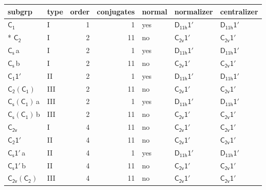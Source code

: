 \documentclass[10pt,a4paper]{article}
\numberwithin{equation}{section}
\newcommand{\grp}[1]{\mathsf{#1}}
\newcommand{\clsletter}[1]{\,{\scriptsize\color{black!55}#1}}
\begin{document}
{\small\begin{longtable}{@{}llrrlll@{}}\toprule
subgrp & type & order & conjugates & normal & normalizer & centralizer\\\midrule\endhead
\bottomrule\endfoot\endlastfoot
\href{../../../rotation/data/pdf/C1.pdf}{$\grp{C_{1}}$} & I & 1 & 1 & yes & \href{D11h-1p.pdf}{$\grp{D_{11h}1'}$} & \href{D11h-1p.pdf}{$\grp{D_{11h}1'}$}\\*
\href{../../../rotation/data/pdf/C2.pdf}{$\grp{C_{2}}$} & I & 2 & 11 & no & \href{C2v-1p.pdf}{$\grp{C_{2v}1'}$} & \href{C2v-1p.pdf}{$\grp{C_{2v}1'}$}\\
\href{../../../rotation/data/pdf/C1v.pdf}{$\grp{C_{s}}$}\clsletter{a} & I & 2 & 1 & yes & \href{D11h-1p.pdf}{$\grp{D_{11h}1'}$} & \href{D11h-1p.pdf}{$\grp{D_{11h}1'}$}\\
\href{../../../rotation/data/pdf/C1v.pdf}{$\grp{C_{s}}$}\clsletter{b} & I & 2 & 11 & no & \href{C2v-1p.pdf}{$\grp{C_{2v}1'}$} & \href{C2v-1p.pdf}{$\grp{C_{2v}1'}$}\\
\href{C1-1p.pdf}{$\grp{C_{1}1'}$} & II & 2 & 1 & yes & \href{D11h-1p.pdf}{$\grp{D_{11h}1'}$} & \href{D11h-1p.pdf}{$\grp{D_{11h}1'}$}\\
\href{C2-C1.pdf}{$\grp{C_{2}}(\grp{C_{1}})$} & III & 2 & 11 & no & \href{C2v-1p.pdf}{$\grp{C_{2v}1'}$} & \href{C2v-1p.pdf}{$\grp{C_{2v}1'}$}\\
\href{C1v-C1.pdf}{$\grp{C_{s}}(\grp{C_{1}})$}\clsletter{a} & III & 2 & 1 & yes & \href{D11h-1p.pdf}{$\grp{D_{11h}1'}$} & \href{D11h-1p.pdf}{$\grp{D_{11h}1'}$}\\
\href{C1v-C1.pdf}{$\grp{C_{s}}(\grp{C_{1}})$}\clsletter{b} & III & 2 & 11 & no & \href{C2v-1p.pdf}{$\grp{C_{2v}1'}$} & \href{C2v-1p.pdf}{$\grp{C_{2v}1'}$}\\
\href{../../../rotation/data/pdf/C2v.pdf}{$\grp{C_{2v}}$} & I & 4 & 11 & no & \href{C2v-1p.pdf}{$\grp{C_{2v}1'}$} & \href{C2v-1p.pdf}{$\grp{C_{2v}1'}$}\\
\href{C2-1p.pdf}{$\grp{C_{2}1'}$} & II & 4 & 11 & no & \href{C2v-1p.pdf}{$\grp{C_{2v}1'}$} & \href{C2v-1p.pdf}{$\grp{C_{2v}1'}$}\\
\href{C1v-1p.pdf}{$\grp{C_{s}1'}$}\clsletter{a} & II & 4 & 1 & yes & \href{D11h-1p.pdf}{$\grp{D_{11h}1'}$} & \href{D11h-1p.pdf}{$\grp{D_{11h}1'}$}\\
\href{C1v-1p.pdf}{$\grp{C_{s}1'}$}\clsletter{b} & II & 4 & 11 & no & \href{C2v-1p.pdf}{$\grp{C_{2v}1'}$} & \href{C2v-1p.pdf}{$\grp{C_{2v}1'}$}\\
\href{C2v-C2.pdf}{$\grp{C_{2v}}(\grp{C_{2}})$} & III & 4 & 11 & no & \href{C2v-1p.pdf}{$\grp{C_{2v}1'}$} & \href{C2v-1p.pdf}{$\grp{C_{2v}1'}$}\\

\end{longtable}}
\end{document}
